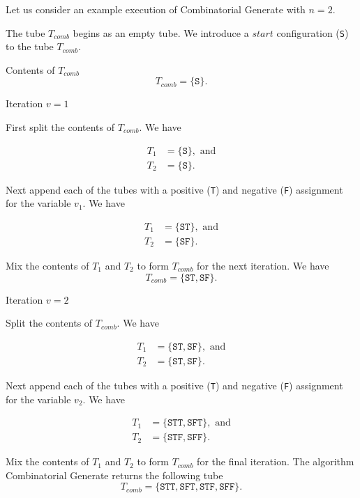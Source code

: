	
\FloatBarrier

Let us consider an example execution of {\sc Combinatorial Generate} with $n = 2$.

\noindent The tube $T_{comb}$ begins as an empty tube.  We introduce a $start$ configuration (\texttt{S}) to the tube $T_{comb}$.

\noindent Contents of $T_{comb}$
\[
T_{comb} = \{ \texttt{S} \}.
\]

\noindent Iteration $v = 1$

First split the contents of $T_{comb}$.  We have

\begin{align*}
 T_1 &= \{ \texttt{S} \}, \text{ and} \\
 T_2 &= \{ \texttt{S} \}.
\end{align*}

Next append each of the tubes with a positive (\texttt{T}) and negative (\texttt{F}) assignment for the variable $v_1$.  We have

\begin{align*}
 T_1 &= \{ \texttt{ST} \}, \text{ and} \\
 T_2 &= \{ \texttt{SF} \}.
\end{align*}

Mix the contents of $T_1$ and $T_2$ to form $T_{comb}$ for the next iteration.  We have
\[
T_{comb} = \{\texttt{ST}, \texttt{SF}\}.
\]


\noindent Iteration $v = 2$

Split the contents of $T_{comb}$.  We have

\begin{align*}
 T_1 &= \{\texttt{ST}, \texttt{SF}\}, \text{ and} \\
 T_2 &= \{\texttt{ST}, \texttt{SF}\}.
\end{align*}

Next append each of the tubes with a positive (\texttt{T}) and negative (\texttt{F}) assignment for the variable $v_2$.  We have

\begin{align*}
 T_1 &= \{\texttt{STT}, \texttt{SFT}\}, \text{ and} \\
 T_2 &= \{\texttt{STF}, \texttt{SFF}\}.
\end{align*}

Mix the contents of $T_1$ and $T_2$ to form $T_{comb}$ for the final iteration.  The algorithm {\sc Combinatorial Generate} returns the following tube
\[
T_{comb} = \{\texttt{STT}, \texttt{SFT}, \texttt{STF}, \texttt{SFF}\}.
\]


